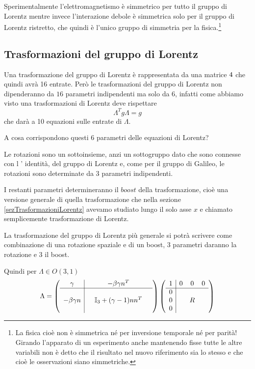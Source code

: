 \documentclass[12pt,a4paper,titlepage, twoside, openright]{book}
\numberwithin{equation}{chapter}
\begin{document}
Sperimentalmente l'elettromagnetismo è simmetrico per tutto il gruppo di Lorentz mentre invece l'interazione debole è simmetrica solo per il gruppo di Lorentz ristretto, che quindi è l'unico gruppo di simmetria per la fisica.\footnote{La fisica cioè non è simmetrica né per inversione temporale né per parità! Girando l'apparato di un esperimento anche mantenendo fisse tutte le altre variabili non è detto che il risultato nel nuovo riferimento sia lo stesso e che cioè le osservazioni siano simmetriche.}

\subsection{Trasformazioni del gruppo di Lorentz}

Una trasformazione del gruppo di Lorentz è rappresentata da una matrice $4\time 4$ che quindi avrà 16 entrate. Però le trasformazioni del gruppo di Lorentz non dipenderanno da $16$ parametri indipendenti ma solo da $6$, infatti come abbiamo visto una trasformazioni di Lorentz deve rispettare
\[
\Lambda^T g \Lambda = g
\]
che darà a 10 equazioni sulle entrate di $\Lambda$.

A cosa corrispondono questi $6$ parametri delle equazioni di Lorentz?

Le rotazioni sono un sottoinsieme, anzi un sottogruppo dato che sono connesse con l ' identità, del gruppo di Lorentz e, come per il gruppo di Galileo, le rotazioni sono determinate da $3$ parametri indipendenti. 

I restanti parametri determineranno il $boost$ della trasformazione, cioè una versione generale di quella trasformazione che nella sezione \ref{sezTrasformazioniLorentz} avevamo studiato lungo il solo asse $x$ e chiamato semplicemente trasformazione di Lorentz.

La trasformazione del gruppo di Lorentz più generale si potrà scrivere come combinazione di una rotazione spaziale e di un boost, $3$ parametri daranno la rotazione e $3$ il boost.

Quindi per $\Lambda\in O(3,1)$ 
\[
\Lambda=\left(\begin{array}{c|ccc}
\gamma & & -\beta\gamma n^T & \\
\hline
 & & & \\
-\beta\gamma n & & \mathbb{I}_3 + (\gamma -1)n n^T& \\
 & & & \\
\end{array}\right)
\left(\begin{array}{c|ccc}
1 & 0 & 0 & 0 \\
\hline
0 & & & \\
0 & & R & \\
0 & & & \\
\end{array}\right)
\]
\end{document}
